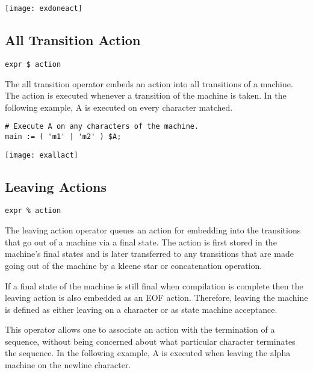 \documentclass[letterpaper,11pt,oneside]{book}
\newcommand{\verbspace}{\vspace{10pt}}
\newcommand{\graphspace}{\vspace{10pt}}
\newenvironment{inline_code}{\def\baselinestretch{1}\vspace{12pt}\small}{}
\begin{document}
\graphspace
\begin{center}
\texttt{[image: exdoneact]}
\end{center}
\graphspace


\subsection{All Transition Action}

\verb|expr $ action|
\verbspace

The all transition operator embeds an action into all transitions of a machine.
The action is executed whenever a transition of the machine is taken. In the
following example, A is executed on every character matched.

\begin{inline_code}
\begin{verbatim}
# Execute A on any characters of the machine.
main := ( 'm1' | 'm2' ) $A;
\end{verbatim}
\end{inline_code}

\graphspace
\begin{center}
\texttt{[image: exallact]}
\end{center}
\graphspace


\subsection{Leaving Actions}
\label{out-actions}

\verb|expr % action|
\verbspace

The leaving action operator queues an action for embedding into the transitions
that go out of a machine via a final state. The action is first stored in
the machine's final states and is later transferred to any transitions that are
made going out of the machine by a kleene star or concatenation operation.

If a final state of the machine is still final when compilation is complete
then the leaving action is also embedded as an EOF action. Therefore, leaving
the machine is defined as either leaving on a character or as state machine
acceptance.

This operator allows one to associate an action with the termination of a
sequence, without being concerned about what particular character terminates
the sequence. In the following example, A is executed when leaving the alpha
machine on the newline character.
\end{document}

